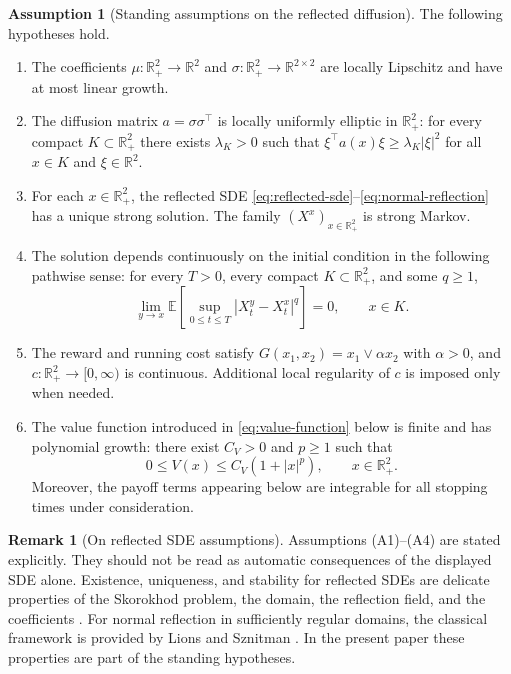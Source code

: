 \documentclass[pdflatex,sn-mathphys-num]{sn-jnl}
\theoremstyle{plain}
\theoremstyle{definition}
\newtheorem{assumption}[theorem]{Assumption}
\newtheorem{remark}[theorem]{Remark}
\newcommand{\R}{\mathbb{R}}
\begin{document}
\begin{assumption}[Standing assumptions on the reflected diffusion]
\label{ass:reflected-diffusion}
The following hypotheses hold.
\begin{enumerate}
\item[\textup{(A1)}]
The coefficients $\mu:\R^2_+\to\R^2$ and $\sigma:\R^2_+\to\R^{2\times2}$ are
locally Lipschitz and have at most linear growth.
\item[\textup{(A2)}]
The diffusion matrix $a=\sigma\sigma^\top$ is locally uniformly elliptic in
$\R^2_+$: for every compact $K\subset\R^2_+$ there exists $\lambda_K>0$ such
that $\xi^\top a(x)\xi\ge\lambda_K|\xi|^2$ for all $x\in K$ and $\xi\in\R^2$.
\item[\textup{(A3)}]
For each $x\in\R^2_+$, the reflected SDE
\eqref{eq:reflected-sde}--\eqref{eq:normal-reflection} has a unique strong
solution. The family $(X^x)_{x\in\R^2_+}$ is strong Markov.
\item[\textup{(A4)}]
The solution depends continuously on the initial condition in the following
pathwise sense: for every $T>0$, every compact $K\subset\R^2_+$, and some
$q\ge1$,
\[
   \lim_{y\to x}
   \mathbb E\left[
      \sup_{0\le t\le T}|X_t^y-X_t^x|^q
   \right]=0,
   \qquad x\in K.
\]
\item[\textup{(A5)}]
The reward and running cost satisfy $G(x_1,x_2)=x_1\vee \alpha x_2$ with
$\alpha>0$, and $c:\R^2_+\to[0,\infty)$ is continuous. Additional local
regularity of $c$ is imposed only when needed.
\item[\textup{(A6)}]
The value function introduced in \eqref{eq:value-function} below is finite and
has polynomial growth: there exist $C_V>0$ and $p\ge1$ such that
\[
   0\le V(x)\le C_V(1+|x|^p),
   \qquad x\in\R^2_+.
\]
Moreover, the payoff terms appearing below are integrable for all stopping
times under consideration.
\end{enumerate}
\end{assumption}

\begin{remark}[On reflected SDE assumptions]
\label{rem:reflected-sde-background}
Assumptions \textup{(A1)}--\textup{(A4)} are stated explicitly. They should
not be read as automatic consequences of the displayed SDE alone. Existence,
uniqueness, and stability for reflected SDEs are delicate properties of the
Skorokhod problem, the domain, the reflection field, and the coefficients
\cite{tanaka1979stochastic,lions1984stochastic,saisho1987stochastic,harrison1981reflected,dupuis1993sdes}.
For normal reflection in sufficiently regular domains, the classical framework
is provided by Lions and Sznitman \cite{lions1984stochastic}. In the present
paper these properties are part of the standing hypotheses.
\end{remark}
\end{document}
